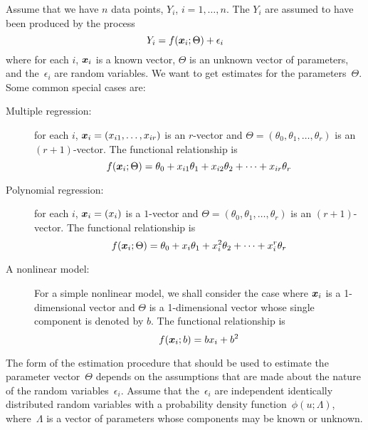\documentclass{admbmanual}
\begin{document}
Assume that we have $n$ data points, $Y_i$, $i=1,\ldots,n$. The $Y_i$ are
assumed to have been produced by the process
\begin{equation}
  \label{eq:robust-nonlinear-regression-00}%
  Y_i=f({\mbox{\boldmath $x$}}_i;\Theta)+\epsilon_i
\end{equation}
where for each $i$, ${\mbox{\boldmath $x$}}_i$ is a known vector, $\Theta$ is an
unknown vector of parameters, and the~$\epsilon_i$ are random variables. We want
to get estimates for the parameters~$\Theta$. Some common special cases are:
\begin{description}

\item[Multiple regression:]
for each $i$,
${\mbox{\boldmath $x$}}_i =(x_{i1},\ldots,x_{ir})$ is an $r$-vector and
$\Theta =(\theta_{0},\theta_{1},\ldots,\theta_{r})$ is an $(r+1)$-vector. The
functional relationship is
\begin{equation*}
  f({\mbox{\boldmath $x$}}_i;\Theta)
  =\theta_0+x_{i1}\theta_1+x_{i2}\theta_2+\cdots+x_{ir}\theta_r
\end{equation*}

\item[Polynomial regression:]
for each $i$, ${\mbox{\boldmath $x$}}_i =(x_i)$  is a $1$-vector and
$\Theta =(\theta_{0},\theta_{1},\ldots,\theta_{r})$ is an $(r+1)$-vector. The
functional relationship is
\begin{equation*}
  f({\mbox{\boldmath $x$}}_i;\Theta)
  =\theta_0+x_i\theta_1+x_i^2\theta_2+\cdots+x_i^r\theta_r
\end{equation*}

\item[A nonlinear model:]

For a simple nonlinear model, we shall consider the case where
${\mbox{\boldmath $x$}}_i$ is a 1-dimensional vector and $\Theta$ is a
1-dimensional vector whose single component is denoted by $b$. The functional
relationship is
\begin{equation}
  \label{eq:robust-nonlinear-regression-01} %
  f({\mbox{\boldmath $x$}}_i;b)=bx_i+b^2
\end{equation}
\end{description}

The form of the estimation procedure that should be used to estimate the
parameter vector~$\Theta$ depends on the assumptions that are made about the
nature of the random variables~$\epsilon_i$. Assume that the~$\epsilon_i$ are
independent identically distributed random variables with a probability density
function~$\phi(u;\Lambda)$, where~$\Lambda$ is a vector of parameters whose
components may be known or unknown.
\end{document}
